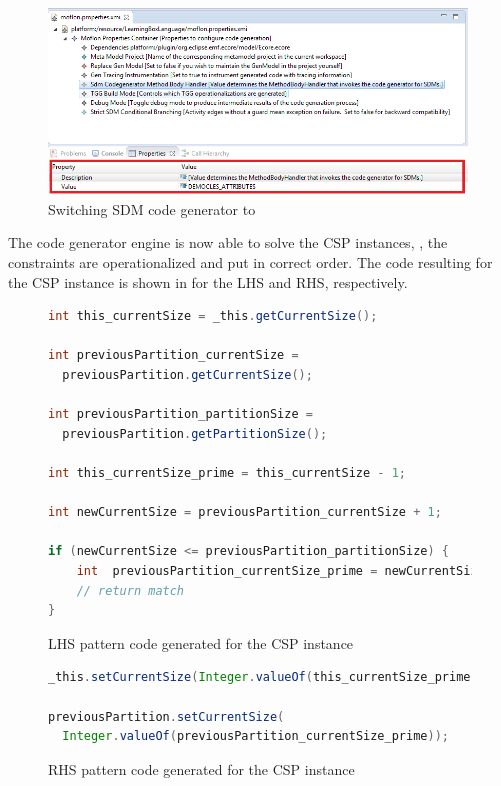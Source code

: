 \begin{stepbystep}
\begin{figure}[htbp]
\begin{center}
  \includegraphics[width=0.99\textwidth]{../../org.moflon.doc.handbook.03_storyDiagrams/13_complexAttributeConstraints/visCACImages/ec_CAC_SwitchCGE}
  \caption{Switching SDM code generator to }  
  \label{ec_CAC_SwitchCGE}
\end{center}
\end{figure}

\end{stepbystep}
The code generator engine is now able to solve the CSP instances, \idest, the constraints are operationalized and put in correct order. 
The code resulting for the CSP instance is shown in  for the LHS and RHS, respectively.
\begin{figure}[htbp]
\begin{lstlisting}[language=Java, keywordstyle={\bfseries\color{purple}}]
int this_currentSize = _this.getCurrentSize();

int previousPartition_currentSize = 
  previousPartition.getCurrentSize();
  
int previousPartition_partitionSize = 
  previousPartition.getPartitionSize();
  
int this_currentSize_prime = this_currentSize - 1;

int newCurrentSize = previousPartition_currentSize + 1;

if (newCurrentSize <= previousPartition_partitionSize) {
    int  previousPartition_currentSize_prime = newCurrentSize;
    // return match
}
\end{lstlisting}
\caption{LHS pattern code generated for the CSP instance}
\label{ea_CAC_penalizeCardLHS}
\end{figure}
    

\begin{figure}[htbp]
\begin{center}
\begin{lstlisting}[language=Java, keywordstyle={\bfseries\color{purple}}]
_this.setCurrentSize(Integer.valueOf(this_currentSize_prime));

previousPartition.setCurrentSize(
  Integer.valueOf(previousPartition_currentSize_prime));
\end{lstlisting}
\caption{RHS pattern code generated for the CSP instance}  
\label{ea_CAC_penalizeCardRHS}
\end{center}
\end{figure}

